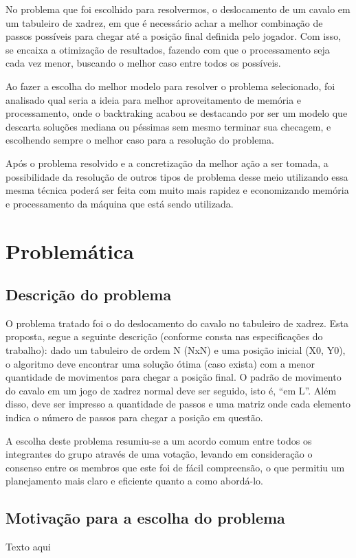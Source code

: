 \documentclass[relatorio]{IEEEtran}
\begin{document}
No problema que foi escolhido para resolvermos, o deslocamento de um cavalo em um tabuleiro de xadrez, em que é necessário achar a melhor combinação de passos possíveis para chegar até a posição final definida pelo jogador. Com isso, se encaixa a otimização de resultados, fazendo com que o processamento seja cada vez menor, buscando o melhor caso entre todos os possíveis.

Ao fazer a escolha do melhor modelo para resolver o problema selecionado, foi analisado qual seria a ideia para melhor aproveitamento de memória e processamento, onde o backtraking acabou se destacando por ser um modelo que descarta soluções mediana ou péssimas sem mesmo terminar sua checagem, e escolhendo sempre o melhor caso para a resolução do problema.

Após o problema resolvido e a concretização da melhor ação a ser tomada, a possibilidade da resolução de outros tipos de problema desse meio utilizando essa mesma técnica poderá ser feita com muito mais rapidez e economizando memória e processamento da máquina que está sendo utilizada.

\section{Problemática}

\subsection{Descrição do problema}
O problema tratado foi o do deslocamento do cavalo no tabuleiro de xadrez. Esta proposta, segue a seguinte descrição (conforme consta nas especificações do trabalho): dado um tabuleiro de ordem N (NxN) e uma posição inicial (X0, Y0), o algoritmo deve encontrar uma solução ótima (caso exista) com a menor quantidade de movimentos para chegar a posição final. O padrão de movimento do cavalo em um jogo de xadrez normal deve ser seguido, isto é, “em L”. Além disso, deve ser impresso a quantidade de passos e uma matriz onde cada elemento indica o número de passos para chegar a posição em questão.

A escolha deste problema resumiu-se a um acordo comum entre todos os integrantes do grupo através de uma votação, levando em consideração o consenso entre os membros que este foi de fácil compreensão, o que permitiu um planejamento mais claro e eficiente quanto a como abordá-lo. 

\subsection{Motivação para a escolha do problema}
Texto aqui
\end{document}
